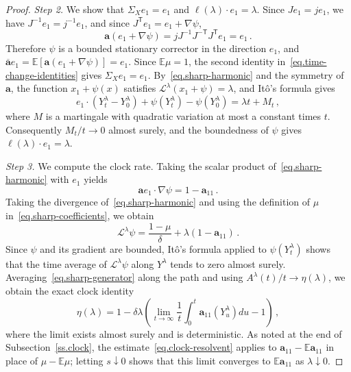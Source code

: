 \documentclass[11pt]{amsart}
\theoremstyle{definition}
\theoremstyle{remark}
\numberwithin{equation}{section}
\newcommand{\E}{\mathbb E}
\renewcommand{\a}{\mathbf a}
\newcommand{\ahom}{\overline{\mathbf a}}
\begin{document}
\begin{proof}
\emph{Step 2.} We show that $\Sigma_Xe_1=e_1$ and $\ell(\lambda)\cdot e_1=\lambda$. Since $Je_1=je_1$, we have $J^{-1}e_1=j^{-1}e_1$, and since $J^{\mathsf T}e_1=e_1+\nabla\psi$,
\begin{equation}\label{eq.sharp-harmonic}
 \a(e_1+\nabla\psi)=jJ^{-1}J^{-\mathsf T}J^{\mathsf T}e_1=e_1\, .
\end{equation}
Therefore $\psi$ is a bounded stationary corrector in the direction $e_1$, and $\ahom e_1=\E[\a(e_1+\nabla\psi)]=e_1$. Since $\E\mu=1$, the second identity in~\eqref{eq.time-change-identities} gives $\Sigma_Xe_1=e_1$. By~\eqref{eq.sharp-harmonic} and the symmetry of $\a$, the function $x_1+\psi(x)$ satisfies $\mathcal L^\lambda(x_1+\psi)=\lambda$, and It\^o's formula gives
\begin{equation*}
 e_1\cdot(Y^\lambda_t-Y^\lambda_0)+\psi(Y^\lambda_t)-\psi(Y^\lambda_0)=\lambda t+M_t\, ,
\end{equation*}
where $M$ is a martingale with quadratic variation at most a constant times $t$. Consequently $M_t/t\to0$ almost surely, and the boundedness of $\psi$ gives $\ell(\lambda)\cdot e_1=\lambda$.

\emph{Step 3.} We compute the clock rate. Taking the scalar product of~\eqref{eq.sharp-harmonic} with $e_1$ yields
\begin{equation*}
 \a e_1\cdot\nabla\psi=1-\a_{11}\, .
\end{equation*}
Taking the divergence of~\eqref{eq.sharp-harmonic} and using the definition of $\mu$ in~\eqref{eq.sharp-coefficients}, we obtain
\begin{equation}\label{eq.sharp-generator}
 \mathcal L^\lambda\psi=\frac{1-\mu}{\delta}+\lambda(1-\a_{11})\, .
\end{equation}
Since $\psi$ and its gradient are bounded, It\^o's formula applied to $\psi(Y^\lambda_t)$ shows that the time average of $\mathcal L^\lambda\psi$ along $Y^\lambda$ tends to zero almost surely. Averaging~\eqref{eq.sharp-generator} along the path and using $A^\lambda(t)/t\to\eta(\lambda)$, we obtain the exact clock identity
\begin{equation}\label{eq.sharp-clock}
 \eta(\lambda)=1-\delta\lambda\left(\lim_{t\to\infty}\frac1t\int_0^t\a_{11}(Y^\lambda_u)du-1\right)\, ,
\end{equation}
where the limit exists almost surely and is deterministic. As noted at the end of Subsection~\ref{ss.clock}, the estimate~\eqref{eq.clock-resolvent} applies to $\a_{11}-\E\a_{11}$ in place of $\mu-\E\mu$; letting $s\downarrow0$ shows that this limit converges to $\E\a_{11}$ as $\lambda\downarrow0$.


\end{proof}
\end{document}
